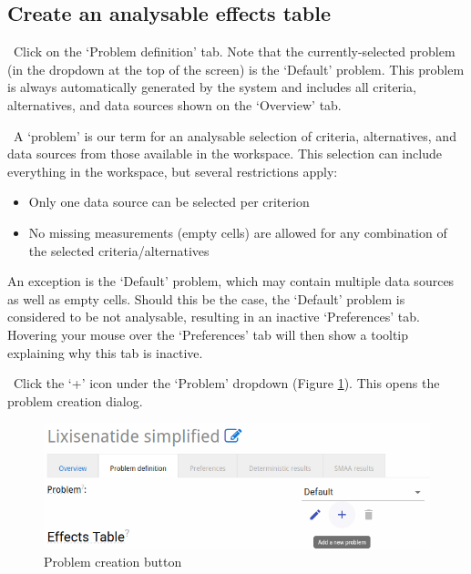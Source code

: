 \documentclass[00_mcda_tutorial.tex]{subfiles}
\begin{document}
\subsection*{Create an analysable effects table}
\leftpointright \, Click on the ‘Problem definition’ tab. Note that the currently-selected problem (in the dropdown at the top of the screen) is the ‘Default’ problem. This problem is always automatically generated by the system and includes all criteria, alternatives, and data sources shown on the ‘Overview’ tab.
\newline

\noindent \faGraduationCap \, A ‘problem’ is our term for an analysable selection of criteria, alternatives, and data sources from those available in the workspace. This selection can include everything in the workspace, but several restrictions apply:

\begin{itemize}
\item Only one data source can be selected per criterion
\item No missing measurements (empty cells) are allowed for any combination of the selected criteria/alternatives
\end{itemize}
	
\noindent An exception is the ‘Default’ problem, which may contain multiple data sources as well as empty cells. Should this be the case, the ‘Default’ problem is considered to be not analysable, resulting in an inactive ‘Preferences’ tab. Hovering your mouse over the ‘Preferences’ tab will then show a tooltip explaining why this tab is inactive.

\noindent \leftpointright \, Click the ‘+’ icon under the ‘Problem’ dropdown (Figure \ref{fig:create_problem}). This opens the problem creation dialog.

\begin{figure}[!h]
    \centering
	\includegraphics[width=.8\textwidth]{fig/createProblem.png}
    \caption{Problem creation button}
	\label{fig:create_problem}
\end{figure}
\end{document}
